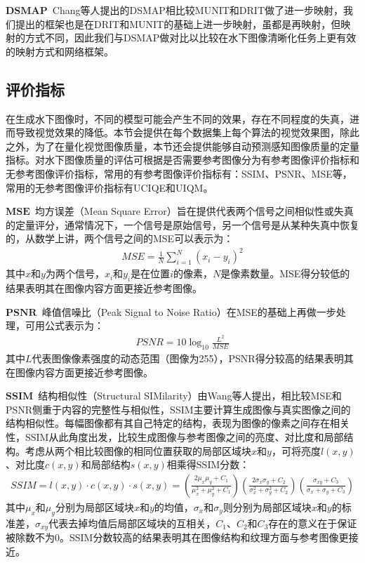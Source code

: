 $\mathbf{DSMAP}$~Chang等人\cite{chang2020domain}提出的DSMAP相比较MUNIT和DRIT做了进一步映射，我们提出的框架也是在DRIT和MUNIT的基础上进一步映射，虽都是再映射，但映射的方式不同，因此我们与DSMAP做对比以比较在水下图像清晰化任务上更有效的映射方式和网络框架。

\subsection{评价指标}

在生成水下图像时，不同的模型可能会产生不同的效果，存在不同程度的失真，进而导致视觉效果的降低。本节会提供在每个数据集上每个算法的视觉效果图，除此之外，为了在量化视觉图像质量，本节还会提供能够自动预测感知图像质量的定量指标。对水下图像质量的评估可根据是否需要参考图像分为有参考图像评价指标和无参考图像评价指标，常用的有参考图像评价指标有：SSIM\cite{wang2004image}、PSNR、MSE等，常用的无参考图像评价指标有UCIQE\cite{yang2015underwater}和UIQM\cite{panetta2015human}。

$\mathbf{MSE}$~均方误差（Mean Square Error）旨在提供代表两个信号之间相似性或失真的定量评分，通常情况下，一个信号是原始信号，另一个信号是从某种失真中恢复的，从数学上讲，两个信号之间的MSE可以表示为：
\begin{equation}
\begin{split}
MSE = \frac{1}{N}\sum_{i=1}^{N}(x_i - y_i)^2
\end{split}
\label{eq:example}
\end{equation}
其中$x$和$y$为两个信号，$x_i$和$y_i$是在位置$i$的像素，$N$是像素数量。MSE得分较低的结果表明其在图像内容方面更接近参考图像。

$\mathbf{PSNR}$~峰值信噪比（Peak Signal to Noise Ratio）在MSE的基础上再做一步处理，可用公式表示为：
\begin{equation}
\begin{split}
PSNR = 10\log_{10}\frac{L^2}{MSE}
\end{split}
\label{eq:example}
\end{equation}
其中$L$代表图像像素强度的动态范围（图像为255），PSNR得分较高的结果表明其在图像内容方面更接近参考图像。

$\mathbf{SSIM}$~结构相似性（Structural SIMilarity）由Wang等人\cite{wang2004image}提出，相比较MSE和PSNR侧重于内容的完整性与相似性，SSIM主要计算生成图像与真实图像之间的结构相似性。每幅图像都有其自己特定的结构，表现为图像的像素之间存在相关性，SSIM从此角度出发，比较生成图像与参考图像之间的亮度、对比度和局部结构。考虑从两个相比较图像的相同位置获取的局部区域块$x$和$y$，可将亮度$l(x,y)$、对比度$c(x,y)$和局部结构$s(x,y)$相乘得SSIM分数：
\begin{equation}
\begin{split}
SSIM=l(x,y)\cdot c(x,y)\cdot s(x,y) =(\frac{2\mu_x\mu_y + C_1}{\mu_x^2+\mu_y^2+C_1})(\frac{2\sigma_x\sigma_y+C_2}{\sigma_x^2+\sigma_y^2+C_2})(\frac{\sigma_{xy}+C_3}{\sigma_x+\sigma_y+C_3})
\end{split}
\label{eq:example}
\end{equation}
其中$\mu_x$和$\mu_y$分别为局部区域块$x$和$y$的均值，$\sigma_x$和$\sigma_y$则分别为局部区域块$x$和$y$的标准差，$\sigma_{xy}$代表去掉均值后局部区域块的互相关，$C_1$、$C_2$和$C_3$存在的意义在于保证被除数不为0。SSIM分数较高的结果表明其在图像结构和纹理方面与参考图像更接近。

